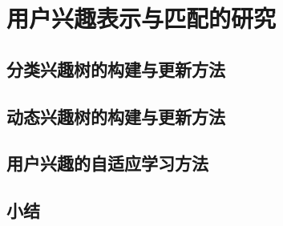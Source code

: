 \section{用户兴趣表示与匹配的研究}

\subsection{分类兴趣树的构建与更新方法}

\subsection{动态兴趣树的构建与更新方法}

\subsection{用户兴趣的自适应学习方法}

\subsection{小结}
